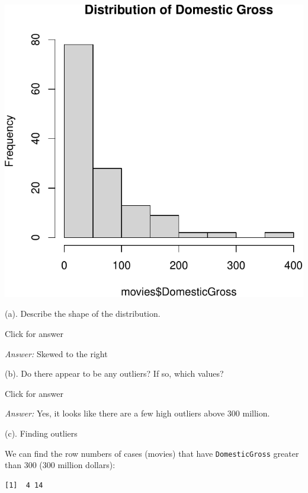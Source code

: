 \documentclass[
]{book}
\newenvironment{Shaded}{\begin{snugshade}}{\end{snugshade}}
\newcommand{\DecValTok}[1]{\textcolor[rgb]{0.00,0.00,0.81}{#1}}
\newcommand{\FunctionTok}[1]{\textcolor[rgb]{0.00,0.00,0.00}{#1}}
\newcommand{\NormalTok}[1]{#1}
\newcommand{\SpecialCharTok}[1]{\textcolor[rgb]{0.00,0.00,0.00}{#1}}
\begin{document}
\includegraphics[width=1\linewidth]{Class_Activity_5_files/figure-latex/unnamed-chunk-2-1}

(a). Describe the shape of the distribution.

Click for answer

\emph{Answer:} Skewed to the right

(b). Do there appear to be any outliers? If so, which values?

Click for answer

\emph{Answer:} Yes, it looks like there are a few high outliers above 300 million.

(c). Finding outliers

We can find the row numbers of cases (movies) that have \texttt{DomesticGross} greater than 300 (300 million dollars):

\begin{Shaded}
\end{Shaded}

\begin{verbatim}
[1]  4 14
\end{verbatim}
\end{document}
